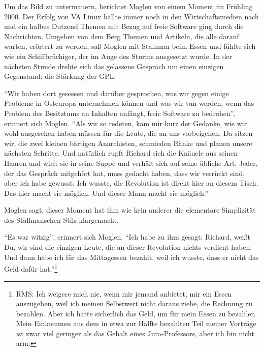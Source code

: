 Um das Bild zu untermauern, berichtet Moglen von einem Moment im Frühling 2000. Der Erfolg von VA Linux hallte immer noch in den Wirtschaftsmedien nach und ein halbes Dutzend Themen mit Bezug auf freie Software ging durch die Nachrichten. Umgeben von dem Berg Themen und Artikeln, die alle darauf warten, erörtert zu werden, saß Moglen mit Stallman beim Essen und fühlte sich wie ein Schiffbrüchiger, der im Auge des Sturms ausgesetzt wurde. In der nächsten Stunde drehte sich das gelassene Gespräch um einen einzigen Gegenstand: die Stärkung der GPL.

"`Wir haben dort gesessen und darüber gesprochen, was wir gegen einige Probleme in Osteuropa unternehmen können und was wir tun werden, wenn das Problem des Besitztums an Inhalten anfängt, freie Software zu bedrohen"', erinnert sich Moglen. "`Als wir so redeten, kam mir kurz der Gedanke, wie wir wohl ausgesehen haben müssen für die Leute, die an uns vorbeigehen. Da sitzen wir, die zwei kleinen bärtigen Anarchisten, schmieden Ränke und planen unsere nächsten Schritte. Und natürlich rupft Richard sich die Knäuele aus seinen Haaren und wirft sie in seine Suppe und verhält sich auf seine übliche Art. Jeder, der das Gespräch mitgehört hat, muss gedacht haben, dass wir verrückt sind, aber ich habe gewusst: Ich wusste, die Revolution ist direkt hier an diesem Tisch. Das hier macht sie möglich. Und dieser Mann macht sie möglich."'

Moglen sagt, dieser Moment hat ihm wie kein anderer die elementare Simplizität des Stallmanschen Stils klargemacht.

"`Es war witzig"', erinnert sich Moglen. "`Ich habe zu ihm gesagt: \glq Richard, weißt Du, wir sind die einzigen Leute, die an dieser Revolution nichts verdient haben.\grq{} Und dann habe ich für das Mittagessen bezahlt, weil ich wusste, dass er nicht das Geld dafür hat."'\footnote{RMS: Ich weigere mich nie, wenn mir jemand anbietet, mir ein Essen auszugeben, weil ich meinen Selbstwert nicht daraus ziehe, die Rechnung zu bezahlen. Aber ich hatte sicherlich das Geld, um für mein Essen zu bezahlen. Mein Einkommen aus dem in etwa zur Hälfte bezahlten Teil meiner Vorträge ist zwar viel geringer als das Gehalt eines Jura-Professors, aber ich bin nicht arm.}
